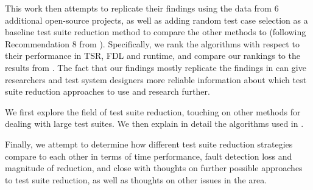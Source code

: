 This work then attempts to replicate their findings using the data
from 6 additional open-source projects, as well as adding random
test case selection as a baseline test suite reduction method
to compare the other methods to (following Recommendation 8 from
\cite{khan2018systematic}). Specifically, we rank the algorithms with
respect to their performance in TSR, FDL and runtime, and compare our
rankings to the results from \cite{cruciani2019scalable}. The fact that
our findings mostly replicate the findings in \cite{cruciani2019scalable}
can give researchers and test system designers more reliable information
about which test suite reduction approaches to use and research further.

We first explore the field of test suite reduction, touching on other
methods for dealing with large test suites. We then explain in detail
the algorithms used in \cite{cruciani2019scalable}.

Finally, we attempt to determine how different test suite reduction
strategies compare to each other in terms of time performance, fault
detection loss and magnitude of reduction, and close with thoughts on
further possible approaches to test suite reduction, as well as thoughts
on other issues in the area.
